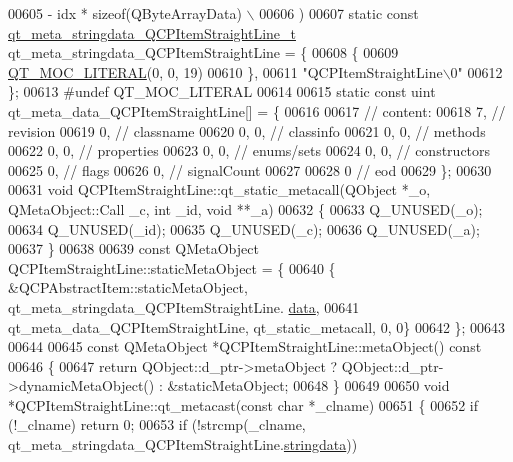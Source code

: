 \begin{DoxyCode}
00605 \textcolor{preprocessor}{        - idx * sizeof(QByteArrayData) \(\backslash\)}
00606 \textcolor{preprocessor}{    )}
00607 \textcolor{keyword}{static} \textcolor{keyword}{const} \hyperlink{a00016_dd/d6d/a00111}{qt\_meta\_stringdata\_QCPItemStraightLine\_t} 
      qt\_meta\_stringdata\_QCPItemStraightLine = \{
00608     \{
00609 \hyperlink{a00016_a75bb9482d242cde0a06c9dbdc6b83abe}{QT\_MOC\_LITERAL}(0, 0, 19)
00610     \},
00611     \textcolor{stringliteral}{"QCPItemStraightLine\(\backslash\)0"}
00612 \};
00613 \textcolor{preprocessor}{#undef QT\_MOC\_LITERAL}
00614 
00615 \textcolor{keyword}{static} \textcolor{keyword}{const} uint qt\_meta\_data\_QCPItemStraightLine[] = \{
00616 
00617  \textcolor{comment}{// content:}
00618        7,       \textcolor{comment}{// revision}
00619        0,       \textcolor{comment}{// classname}
00620        0,    0, \textcolor{comment}{// classinfo}
00621        0,    0, \textcolor{comment}{// methods}
00622        0,    0, \textcolor{comment}{// properties}
00623        0,    0, \textcolor{comment}{// enums/sets}
00624        0,    0, \textcolor{comment}{// constructors}
00625        0,       \textcolor{comment}{// flags}
00626        0,       \textcolor{comment}{// signalCount}
00627 
00628        0        \textcolor{comment}{// eod}
00629 \};
00630 
00631 \textcolor{keywordtype}{void} QCPItemStraightLine::qt\_static\_metacall(QObject *\_o, QMetaObject::Call \_c, \textcolor{keywordtype}{int} \_id, \textcolor{keywordtype}{void} **\_a)
00632 \{
00633     Q\_UNUSED(\_o);
00634     Q\_UNUSED(\_id);
00635     Q\_UNUSED(\_c);
00636     Q\_UNUSED(\_a);
00637 \}
00638 
00639 \textcolor{keyword}{const} QMetaObject QCPItemStraightLine::staticMetaObject = \{
00640     \{ &QCPAbstractItem::staticMetaObject, qt\_meta\_stringdata\_QCPItemStraightLine.
      \hyperlink{a00016_a86cfd75cdbd69fb7bac81f44368368a2}{data},
00641       qt\_meta\_data\_QCPItemStraightLine,  qt\_static\_metacall, 0, 0\}
00642 \};
00643 
00644 
00645 \textcolor{keyword}{const} QMetaObject *QCPItemStraightLine::metaObject()\textcolor{keyword}{ const}
00646 \textcolor{keyword}{}\{
00647     \textcolor{keywordflow}{return} QObject::d\_ptr->metaObject ? QObject::d\_ptr->dynamicMetaObject() : &staticMetaObject;
00648 \}
00649 
00650 \textcolor{keywordtype}{void} *QCPItemStraightLine::qt\_metacast(\textcolor{keyword}{const} \textcolor{keywordtype}{char} *\_clname)
00651 \{
00652     \textcolor{keywordflow}{if} (!\_clname) \textcolor{keywordflow}{return} 0;
00653     \textcolor{keywordflow}{if} (!strcmp(\_clname, qt\_meta\_stringdata\_QCPItemStraightLine.\hyperlink{a00016_a4fcd4918ec3f5999a6ee9ce08ebcdb96}{stringdata}))

\end{DoxyCode}
